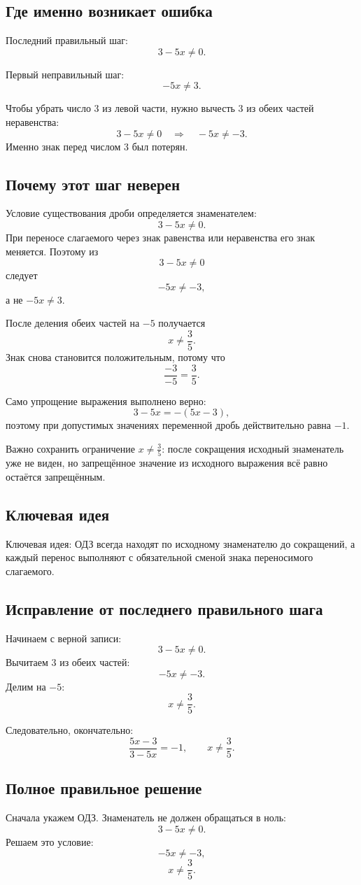 \documentclass[12pt,a4paper]{article}
\begin{document}
\subsection*{Где именно возникает ошибка}
Последний правильный шаг:
\[
3-5x\ne0.
\]

Первый неправильный шаг:
\[
-5x\ne3.
\]

Чтобы убрать число $3$ из левой части, нужно вычесть $3$ из обеих частей неравенства:
\[
3-5x\ne0
\quad\Longrightarrow\quad
-5x\ne-3.
\]
Именно знак перед числом $3$ был потерян.

\subsection*{Почему этот шаг неверен}
Условие существования дроби определяется знаменателем:
\[
3-5x\ne0.
\]
При переносе слагаемого через знак равенства или неравенства его знак меняется. Поэтому из
\[
3-5x\ne0
\]
следует
\[
-5x\ne-3,
\]
а не $-5x\ne3$.

После деления обеих частей на $-5$ получается
\[
x\ne\frac35.
\]
Знак снова становится положительным, потому что
\[
\frac{-3}{-5}=\frac35.
\]

Само упрощение выражения выполнено верно:
\[
3-5x=-(5x-3),
\]
поэтому при допустимых значениях переменной дробь действительно равна $-1$.

Важно сохранить ограничение $x\ne\frac35$: после сокращения исходный знаменатель уже не виден, но запрещённое значение из исходного выражения всё равно остаётся запрещённым.

\subsection*{Ключевая идея}
\textcolor{blue!60!black}{Ключевая идея:} ОДЗ всегда находят по исходному знаменателю до сокращений, а каждый перенос выполняют с обязательной сменой знака переносимого слагаемого.

\subsection*{Исправление от последнего правильного шага}
Начинаем с верной записи:
\[
3-5x\ne0.
\]
Вычитаем $3$ из обеих частей:
\[
-5x\ne-3.
\]
Делим на $-5$:
\[
x\ne\frac35.
\]

Следовательно, окончательно:
\[
\frac{5x-3}{3-5x}=-1,
\qquad
x\ne\frac35.
\]

\subsection*{Полное правильное решение}
Сначала укажем ОДЗ. Знаменатель не должен обращаться в ноль:
\[
3-5x\ne0.
\]
Решаем это условие:
\[
-5x\ne-3,
\]
\[
x\ne\frac35.
\]
\end{document}
